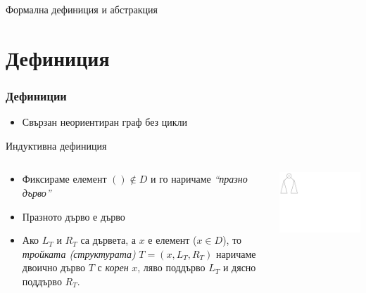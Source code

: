 \documentclass{beamer}
\begin{document}
\begin{frame}
\centerline{Формална дефиниция и абстракция}
\end{frame}


\section{Дефиниция}


\begin{frame}[fragile]
\frametitle{Дефиниции}

    \begin{itemize}
      \item Свързан неориентиран граф без цикли
    \end{itemize}

    \vspace{1.5em}
     Индуктивна дефиниция

\begin{columns}[t]
  \begin{column}{0.65\textwidth}


    \begin{itemize}
      \item Фиксираме елемент $() \notin D$ и го наричаме \emph{``празно дърво''}
      \item Празното дърво е дърво
      \item Ако $L_T$ и $R_T$ са дървета, а $x$ е елемент ($x \in D$), то \emph{тройката (структурата)} $T=(x,L_T,R_T)$ наричаме двоично дърво $T$ с \emph{корен} $x$, ляво поддърво $L_T$ и дясно поддърво $R_T$.
    \end{itemize}

  \end{column}
  \begin{column}{0.35\textwidth}

    \includegraphics[width=9cm]{images/tree_recursive}

  \end{column}
\end{columns}


\end{frame}
\end{document}
